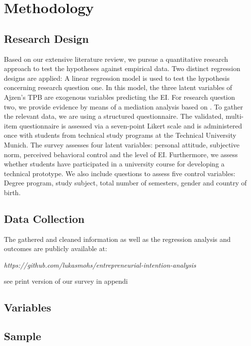 \chapter{Methodology}\label{chapter:Methodology}
\section{Research Design}
Based on our extensive literature review, we pursue a quantitative research approach to test the hypotheses against empirical data. Two distinct regression designs are applied: A linear regression model is used to test the hypothesis concerning research question one. In this model, the three latent variables of Ajzen's TPB are exogenous variables predicting the EI. For research question two, we provide evidence by means of a mediation analysis based on \cite{baron1986moderator}.
To gather the relevant data, we are using a structured questionnaire. The validated, multi-item questionnaire is assessed via a seven-point Likert scale and is administered once with students from technical study programs at the Technical University Munich. The survey assesses four latent variables: personal attitude, subjective norm, perceived behavioral control and the level of EI.  Furthermore, we assess whether students have participated in a university course for developing a technical prototype. We also include questions to assess five control variables: Degree program, study subject, total number of semesters, gender and country of birth.

\section{Data Collection}

The gathered and cleaned information as well as the regression analysis and outcomes are publicly available at: 

\begin{center}
\textit{https://github.com/lukasmohs/entrepreneurial-intention-analysis}
\end{center} 

see print version of our survey in appendi

\section{Variables}
\section{Sample}
